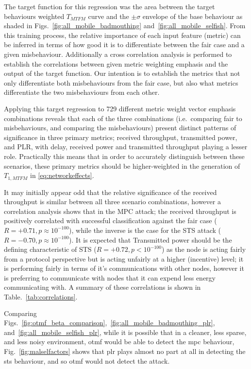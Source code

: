 The target function for this regression was the area between the target behaviours weighted $T_{MTFM}$ curve and the $\pm\sigma$ envelope of the base behaviour as shaded in Figs.~\ref{fig:all_mobile_badmouthing} and~\ref{fig:all_mobile_selfish}.
From this training process, the relative importance of each input feature (metric) can be inferred in terms of how good it is to differentiate between the fair case and a given misbehaviour.
Additionally a cross correlation analysis is performed to establish the correlations between given metric weighting emphasis and the output of the target function.
Our intention is to establish the metrics that not only differentiate both misbehaviours from the fair case, but also what metrics differentiate the two misbehaviours from each other.

Applying this target regression to 729 different metric weight vector emphasis combinations reveals that each of the three combinations (i.e.\ comparing fair to misbehaviours, and comparing the misbehaviours) present distinct patterns of significance in three primary metrics; received throughput, transmitted power, and PLR, with delay, received power and transmitted throughput playing a lesser role.
Practically this means that in order to accurately distinguish between these scenarios, these primary metrics should be higher-weighted in the generation of $T_{1,MTFM}$ in \autoref{eq:networkeffects}.

It may initially appear odd that the relative significance of the received throughput is similar between all three scenario combinations, however a correlation analysis shows that in the MPC attack; the received throughput is positively correlated with successful classification against the fair case ($R=+0.71, p\approx10^{-100}$), while the inverse is the case for the STS attack ($R=-0.70, p\approx10^{-100}$).
It is expected that Transmitted power should be the defining characteristic of STS ($R=+0.72, p<10^{-100}$) as the node is acting fairly from a protocol perspective but is acting unfairly at a higher (incentive) level; it is performing fairly in terms of it's communications with other nodes, however it is preferring to communicate with nodes that it can expend less energy communicating with.
A summary of these correlations is shown in Table.~\ref{tab:correlations}.

Comparing Figs.~\ref{fig:otmf_beta_comparison},~\ref{fig:all_mobile_badmouthing_plr}, and~\ref{fig:all_mobile_selfish_plr}, while it is possible that in a cleaner, less sparse, and less noisy environment, \gls{otmf} would be able to detect the \gls{mpc} behaviour, Fig.~\ref{fig:malselfactors} shows that \gls{plr} plays almost no part at all in detecting the \gls{sts} behaviour, and so \gls{otmf} would not detect the attack.

